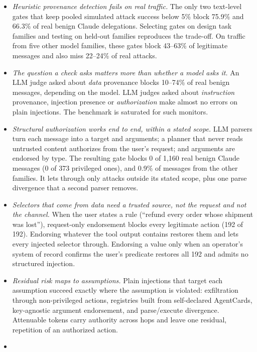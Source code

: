 \documentclass[
  11pt]{article}
\providecommand{\tightlist}{%
  \setlength{\itemsep}{0pt}\setlength{\parskip}{0pt}}
\begin{document}
\begin{itemize}
\tightlist
\item
  \emph{Heuristic provenance detection fails on real traffic.} The only
  two text-level gates that keep pooled simulated attack success below
  5\% block 75.9\% and 66.3\% of real benign Claude delegations.
  Selecting gates on design task families and testing on held-out
  families reproduces the trade-off. On traffic from five other model
  families, these gates block 43--63\% of legitimate messages and also
  miss 22--24\% of real attacks.
\item
  \emph{The question a check asks matters more than whether a model asks
  it.} An LLM judge asked about \emph{data} provenance blocks 10--74\%
  of real benign messages, depending on the model. LLM judges asked
  about \emph{instruction} provenance, injection presence or
  \emph{authorization} make almost no errors on plain injections. The
  benchmark is saturated for such monitors.
\item
  \emph{Structural authorization works end to end, within a stated
  scope.} LLM parsers turn each message into a target and arguments; a
  planner that never reads untrusted content authorizes from the user's
  request; and arguments are endorsed by type. The resulting gate blocks
  0 of 1,160 real benign Claude messages (0 of 373 privileged ones), and
  0.9\% of messages from the other families. It lets through only
  attacks outside its stated scope, plus one parse divergence that a
  second parser removes.
\item
  \emph{Selectors that come from data need a trusted source, not the
  request and not the channel.} When the user states a rule (``refund
  every order whose shipment was lost''), request-only endorsement
  blocks every legitimate action (192 of 192). Endorsing whatever the
  tool output contains restores them and lets every injected selector
  through. Endorsing a value only when an operator's system of record
  confirms the user's predicate restores all 192 and admits no
  structured injection.
\item
  \emph{Residual risk maps to assumptions.} Plain injections that target
  each assumption succeed exactly where the assumption is violated:
  exfiltration through non-privileged actions, registries built from
  self-declared AgentCards, key-agnostic argument endorsement, and
  parse/execute divergence. Attenuable tokens carry authority across
  hops and leave one residual, repetition of an authorized action.
\item

\end{itemize}
\end{document}
